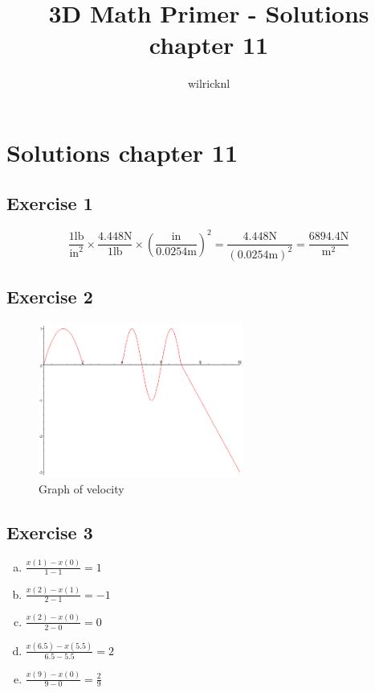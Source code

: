 \documentclass[11pt]{article}
\author{wilricknl}
\title{3D Math Primer - Solutions chapter 11}
\begin{document}
\maketitle

\section{Solutions chapter 11}

\subsection{Exercise 1}

$$\frac{1\text{lb}}{\text{in}^2} \times \frac{4.448\text{N}}{1\text{lb}} \times \left(\frac{\text{in}}{0.0254\text{m}}\right)^2=\frac{4.448\text{N}}{(0.0254\text{m})^2} = \frac{6894.4\text{N}}{\text{m}^2}$$

\subsection{Exercise 2}

\begin{figure}[H]
\centering
    \includegraphics[width=0.6\textwidth]{exercise02}
\caption{Graph of velocity}
\label{fig:velocity-graph}
\end{figure}

\subsection{Exercise 3}

\begin{enumerate}[a.]
	\item $\frac{x(1)-x(0)}{1-1} = 1$
	\item $\frac{x(2)-x(1)}{2-1} = -1$
	\item $\frac{x(2)-x(0)}{2-0} = 0$
	\item $\frac{x(6.5)-x(5.5)}{6.5-5.5} = 2$
	\item $\frac{x(9)-x(0)}{9-0} = \frac{2}{9}$
\end{enumerate}
\end{document}
